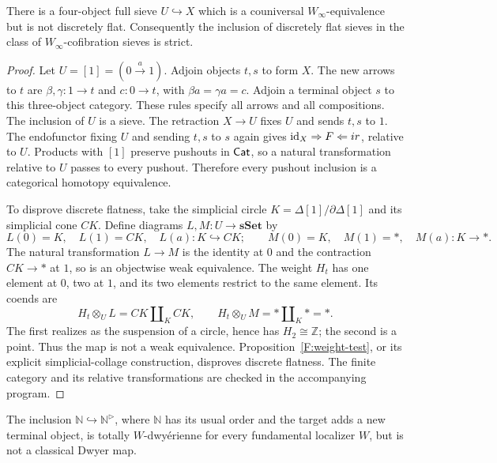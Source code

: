 \begin{theorem}\label{F:h-not-DF}
There is a four-object full sieve $U\hookrightarrow X$ which
is a couniversal $W_\infty$-equivalence but is not discretely
flat. Consequently the inclusion of discretely flat sieves in
the class of $W_\infty$-cofibration sieves is strict.
\end{theorem}

\begin{proof}
Let $U=[1]=(0\xrightarrow{a}1)$. Adjoin objects $t,s$ to form
$X$. The new arrows to $t$ are
$\beta,\gamma:1\to t$ and $c:0\to t$, with
$\beta a=\gamma a=c$. Adjoin a terminal object $s$ to this
three-object category. These rules specify all arrows and all
compositions. The inclusion of $U$ is a sieve. The retraction
$X\to U$ fixes $U$ and sends $t,s$ to $1$. The endofunctor
fixing $U$ and sending $t,s$ to $s$ again gives
$\mathrm{id}_X\Rightarrow F\Leftarrow ir$, relative to $U$.
Products with $[1]$ preserve pushouts in $\mathsf{Cat}$, so a natural
transformation relative to $U$ passes to every pushout. Therefore
every pushout inclusion is a categorical homotopy equivalence.

To disprove discrete flatness, take the simplicial circle
$K=\Delta[1]/\partial\Delta[1]$ and its simplicial cone $CK$.
Define diagrams $L,M:U\to\mathbf{sSet}$ by
\[
 L(0)=K,\quad L(1)=CK,\quad L(a):K\hookrightarrow CK;
 \qquad
 M(0)=K,\quad M(1)=*,\quad M(a):K\to *.
\]
The natural transformation $L\to M$ is the identity at $0$
and the contraction $CK\to *$ at $1$, so is an objectwise
weak equivalence. The weight $H_t$ has one element at $0$,
two at $1$, and its two elements restrict to the same element.
Its coends are
\[
 H_t\otimes_U L=CK\amalg_K CK,\qquad
 H_t\otimes_U M=*\amalg_K *=*.
\]
The first realizes as the suspension of a circle, hence has
$H_2\cong\mathbb Z$; the second is a point. Thus the map is
not a weak equivalence. Proposition~\ref{F:weight-test}, or its
explicit simplicial-collage construction, disproves discrete
flatness. The finite category and its relative transformations
are checked in the accompanying program.
\end{proof}

\begin{proposition}\label{F:classical-strict}
The inclusion $\mathbb N\hookrightarrow\mathbb N^{\triangleright}$,
where $\mathbb N$ has its usual order and the target adds a new
terminal object, is totally $W$-dwy\'erienne for every
fundamental localizer $W$, but is not a classical Dwyer map.
\end{proposition}

